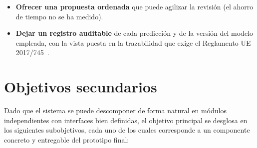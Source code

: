 \begin{itemize}
 \item \textbf{Ofrecer una propuesta ordenada} que puede agilizar la revisión (el ahorro de tiempo no se ha medido).
 \item \textbf{Dejar un registro auditable} de cada predicción y de la versión del modelo empleada, con la vista puesta en la trazabilidad que exige el Reglamento UE 2017/745~\cite{eu2017745}.
\end{itemize}

\section{Objetivos secundarios}

Dado que el sistema se puede descomponer de forma natural en módulos independientes con interfaces bien definidas, el objetivo principal se desglosa en los siguientes subobjetivos, cada uno de los cuales corresponde a un componente concreto y entregable del prototipo final:

